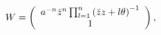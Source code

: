 \begin{equation}
W=\left(
\begin{array}
[c]{c}%
a^{-n}\bar{z}^{n}\prod_{l=1}^{n}\left( \bar{z}z+l\theta\right) ^{-1}\\
1
\end{array}
\right) , \label{w1}%
\end{equation}

